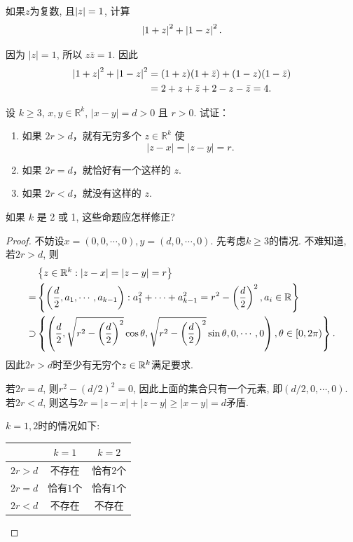 \documentclass{article}
\begin{document}
\begin{problem}[1-14]
如果$ z $为复数, 且$ \left|z\right|=1 $, 计算
\[ \left|1+z\right|^2+\left|1-z\right|^2. \] 
\end{problem}

\begin{solution}
因为 $|z|=1$, 所以 $z\bar{z}=1$. 因此
\begin{align*}
\left|1+z\right|^2+\left|1-z\right|^2&=(1+z)(1+\bar{z})+(1-z)(1-\bar{z})\\
&=2+z+\bar{z}+2-z-\bar{z}=4.
\end{align*}
\end{solution}

\begin{problem}[1-16]
设 \( k \geq 3 \), \( x, y \in \mathbb{R}^k \), \( |x - y| = d > 0 \) 且 \( r > 0 \). 试证：

\begin{enumerate}[label=(\alph*)]
\item 如果 \( 2r > d \)，就有无穷多个 \( z \in \mathbb{R}^k \) 使
\[
|z - x| = |z - y| = r.
\]
\item 如果 \( 2r = d \)，就恰好有一个这样的 \( z \). 
\item 如果 \( 2r < d \)，就没有这样的 \( z \). 
\end{enumerate}

如果 \( k \) 是 2 或 1, 这些命题应怎样修正? 
\end{problem}

\begin{proof}
不妨设$ x=(0,0,\cdots,0),y=(d,0,\cdots,0) $. 先考虑$ k\ge 3 $的情况. 不难知道, 若$ 2r>d $, 则
\begin{align*}
&\left\{z\in\mathbb{R}^k:\left|z-x\right|=\left|z-y\right|=r\right\}\\
=&\left\{\left(\frac{d}{2},a_1,\cdots,a_{k-1}\right):a_1^2+\cdots+a_{k-1}^2=r^2-\left(\frac{d}{2}\right)^2, a_i\in\mathbb{R}\right\}\\
\supset&\left\{\left(\frac{d}{2},\sqrt{r^2-\left(\frac{d}{2}\right)^2}\cos\theta,\sqrt{r^2-\left(\frac{d}{2}\right)^2}\sin\theta,0,\cdots,0\right),\theta\in [0,2\pi) \right\}.
\end{align*}
因此$ 2r>d $时至少有无穷个$ z\in\mathbb{R}^k $满足要求.\par 
若$ 2r=d $, 则$ r^2-(d/2)^2=0 $, 因此上面的集合只有一个元素, 即$ (d/2,0,\cdots,0) $.
若$ 2r<d $, 则这与$ 2r=|z-x|+|z-y|\ge| x-y |=d $矛盾.\par
$ k=1,2 $时的情况如下:

\begin{table}[H]
    \centering
    \begin{tabular}{ccc}
        \toprule
         & $ k=1 $ & $ k=2 $ \\
        \midrule
        $ 2r>d $ & 不存在 & 恰有$ 2 $个 \\
        $ 2r=d $ & 恰有$ 1 $个 & 恰有$ 1 $个 \\
        $ 2r<d $ & 不存在 & 不存在 \\
        \bottomrule
    \end{tabular}
\end{table}

\end{proof}
\end{document}
